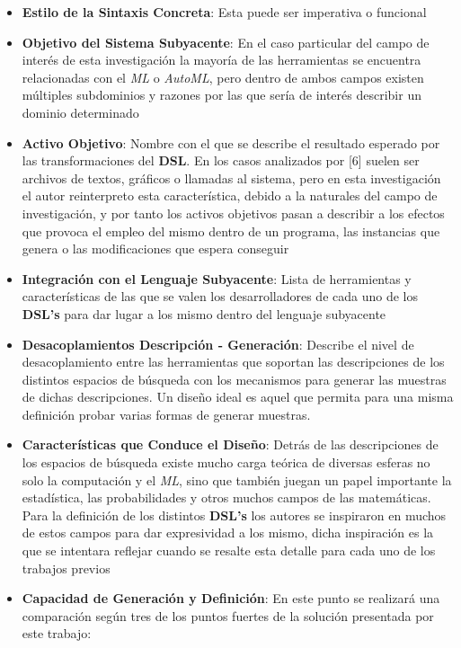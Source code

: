 \begin{itemize}
    \item {\bf Estilo de la Sintaxis Concreta}: Esta puede ser imperativa o funcional
    \item {\bf Objetivo del Sistema Subyacente}: En el caso particular del campo de interés de esta
          investigación la mayoría de las herramientas se encuentra relacionadas con el {\it ML} o
              {\it AutoML}, pero dentro de ambos campos existen múltiples subdominios y razones por las que
          sería de interés describir un dominio determinado
    \item {\bf Activo Objetivo}: Nombre con el que se describe el resultado esperado por las transformaciones
          del {\bf DSL}. En los casos analizados por [6] suelen ser archivos de textos, gráficos o llamadas
          al sistema, pero en esta investigación el autor reinterpreto esta característica, debido a la
          naturales del campo de investigación, y por tanto los activos objetivos pasan a describir a
          los efectos que provoca el empleo del mismo dentro de un programa, las instancias que
          genera o las modificaciones que espera conseguir
    \item {\bf Integración con el Lenguaje Subyacente}: Lista de herramientas y características de las
          que se valen los desarrolladores de cada uno de los {\bf DSL's} para dar lugar a los mismo dentro
          del lenguaje subyacente
    \item {\bf Desacoplamientos Descripción - Generación}: Describe el nivel de desacoplamiento entre
          las herramientas que soportan las descripciones de los distintos espacios de búsqueda con
          los mecanismos para generar las muestras de dichas descripciones. Un diseño ideal
          es aquel que permita para una misma definición probar varias formas de generar muestras.
    \item {\bf Características que Conduce el Diseño}: Detrás de las descripciones de los espacios de
          búsqueda existe mucho carga teórica de diversas esferas no solo la computación y el {\it ML},
          sino que también juegan un papel importante la estadística, las probabilidades y otros muchos
          campos de las matemáticas. Para la definición de los distintos {\bf DSL's} los autores se inspiraron
          en muchos de estos campos para dar expresividad a los mismo, dicha inspiración es la que se
          intentara reflejar cuando se resalte esta detalle para cada uno de los trabajos previos
    \item {\bf Capacidad de Generación y Definición}: En este punto se realizará una comparación según tres
          de los puntos fuertes de la solución presentada por este trabajo:
          \begin{itemize}


\end{itemize}
\end{itemize}
